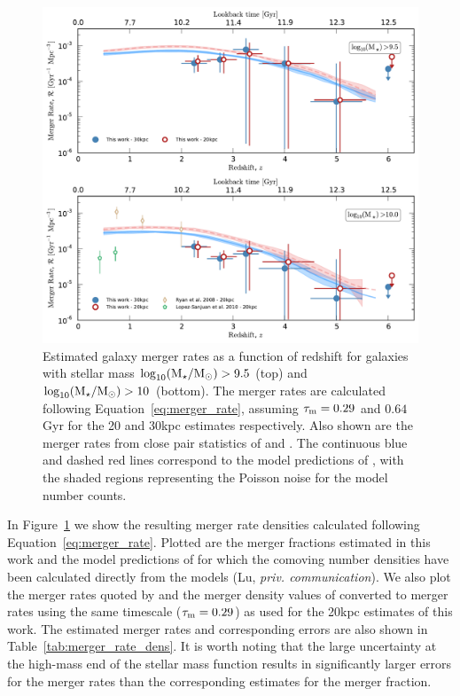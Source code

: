 \begin{figure}
\centering
	\includegraphics[width=\columnwidth]{plots/merger_rate.pdf}
  \caption[Estimated galaxy merger rates as a function of redshift.]{Estimated galaxy merger rates as a function of redshift for galaxies with stellar mass $\log_{10}(\text{M}_{\star} / \text{M}_{\odot}) > 9.5$ (top) and $\log_{10}(\text{M}_{\star} / \text{M}_{\odot}) > 10$ (bottom). The merger rates are calculated following Equation~\ref{eq:merger_rate}, assuming $\tau_{\rm{m}} = 0.29$ and $0.64$ Gyr for the 20 and 30kpc estimates respectively.   Also shown are the merger rates from close pair statistics of \citet{RyanJr:2008ka} and \citet{LopezSanjuan:2010cz}. The continuous blue and dashed red lines correspond to the model predictions of \citet{Lu:2011hj,Lu:2014kl}, with the shaded regions representing the Poisson noise for the model number counts.}
  \label{fig:merger_rate}
\end{figure}

In Figure~\ref{fig:merger_rate} we show the resulting merger rate densities calculated following Equation~\ref{eq:merger_rate}. Plotted are the merger fractions estimated in this work and the model predictions of \citet{Lu:2011hj} for which the comoving number densities have been calculated directly from the models (Lu, \emph{priv. communication}). We also plot the merger rates quoted by \citet{LopezSanjuan:2010cz} and the merger density values of \citet{RyanJr:2008ka} converted to merger rates using the same timescale ($\tau_{\rm{m}} = 0.29$) as used for the 20kpc estimates of this work. The estimated merger rates and corresponding errors are also shown in Table~\ref{tab:merger_rate_dens}. It is worth noting that the large uncertainty at the high-mass end of the stellar mass function results in significantly larger errors for the merger rates than the corresponding estimates for the merger fraction.

